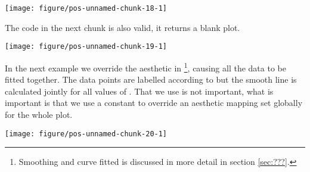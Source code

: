 \documentclass[paper=a4,10pt,div=17,headsepline,BCOR=12mm,twoside,open=right]{scrbook}\usepackage{knitr}
\begin{document}
\begin{knitrout}\footnotesize
{}\color{fgcolor}\begin{kframe}
\begin{alltt}
\hlstd{()} \hlopt{+}
  \hlstd{(} \hlstd{=}    \hlopt{/} 
       \hlstd{=}  \hlopt{+}
  \hlstd{(} 
\end{alltt}
\end{kframe}

{\centering \texttt{[image: figure/pos-unnamed-chunk-18-1]} 

}



\end{knitrout}

The code in the next chunk is also valid, it returns a blank plot.

\begin{knitrout}\footnotesize
{}\color{fgcolor}\begin{kframe}
\begin{alltt}
\hlstd{()}
\end{alltt}
\end{kframe}

{\centering \texttt{[image: figure/pos-unnamed-chunk-19-1]} 

}



\end{knitrout}

In the next example we override the  aesthetic in \footnote{Smoothing and curve fitted is discussed in more detail in section \ref{sec:???}.}, causing all the data to be fitted together. The data points are labelled according to  but the smooth line is calculated jointly for all values of . That we use  is not important, what is important is that we use a constant to override an aesthetic mapping set globally for the whole plot.

\begin{knitrout}\footnotesize
{}\color{fgcolor}\begin{kframe}
\begin{alltt}
\hlstd{(}  \hlstd{(}  \hlstd{=} \hlopt{+}
  \hlstd{(}\hlstd{=}\hlstd{)} \hlopt{+}
  \hlstd{()}
\end{alltt}
\end{kframe}

{\centering \texttt{[image: figure/pos-unnamed-chunk-20-1]} 

}



\end{knitrout}
\end{document}
